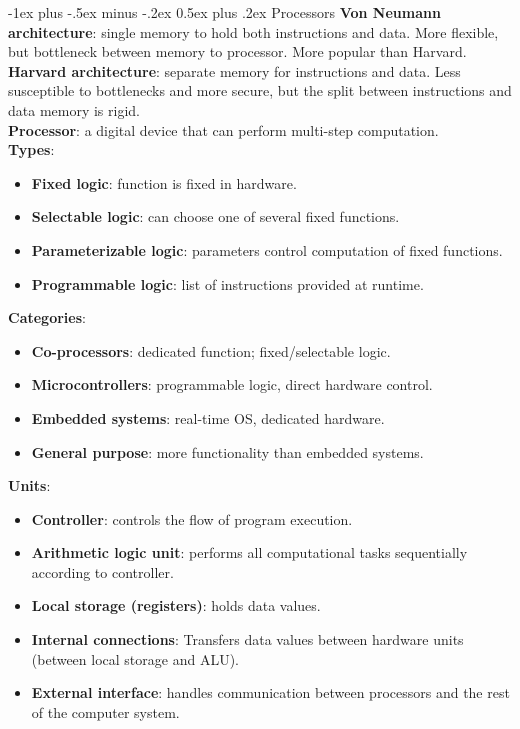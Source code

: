 \documentclass[10pt,landscape]{article}
\makeatletter
\renewcommand{\section}{\@startsection{section}{1}{0mm}%
                                {-1ex plus -.5ex minus -.2ex}%
                                {0.5ex plus .2ex}%
                                {\normalfont\scriptsize\bfseries}}
\makeatother
\begin{document}
\begin{multicols}{3}
\section{Processors}
\textbf{Von Neumann architecture}: single memory to hold both instructions and data. More flexible, but bottleneck between memory to processor. More popular than Harvard.\\
\textbf{Harvard architecture}: separate memory for instructions and data. Less susceptible to bottlenecks and more secure, but the split between instructions and data memory is rigid.\\
\textbf{Processor}: a digital device that can perform multi-step computation.\\
\textbf{Types}:
\begin{itemize}
\item \textbf{Fixed logic}: function is fixed in hardware.
\item \textbf{Selectable logic}: can choose one of several fixed functions.
\item \textbf{Parameterizable logic}: parameters control computation of fixed functions.
\item \textbf{Programmable logic}: list of instructions provided at runtime.
\end{itemize}
\textbf{Categories}:
\begin{itemize}
\item\textbf{Co-processors}: dedicated function; fixed/selectable logic.
\item\textbf{Microcontrollers}: programmable logic, direct hardware control.
\item\textbf{Embedded systems}: real-time OS, dedicated hardware.
\item\textbf{General purpose}: more functionality than embedded systems.
\end{itemize}
\textbf{Units}:
\begin{itemize}
\item\textbf{Controller}: controls the flow of program execution.
\item\textbf{Arithmetic logic unit}: performs all computational tasks sequentially according to controller.
\item\textbf{Local storage (registers)}: holds data values.
\item\textbf{Internal connections}: Transfers data values between hardware units (between local storage and ALU).
\item\textbf{External interface}: handles communication between processors and the rest of the computer system.
\end{itemize}

\end{multicols}
\end{document}
